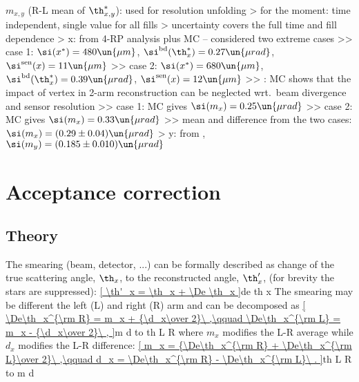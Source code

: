 \> $m_{x, y}$ (R-L mean of $\th_{x, y}^*$): used for resolution unfolding
\>> for the moment: time independent, single value for all fills
\>> uncertainty covers the full time and fill dependence
\>> x: from 4-RP analysis plus MC -- considered two extreme cases
\>>> case 1: $\si(x^*) = 480\un{\mu m}$, $\si^{\rm bd}(\th^*_x) = 0.27\un{\mu rad}$, $\si^{\rm sen}(x) = 11\un{\mu m}$
\>>> case 2: $\si(x^*) = 680\un{\mu m}$, $\si^{\rm bd}(\th^*_x) = 0.39\un{\mu rad}$, $\si^{\rm sen}(x) = 12\un{\mu m}$
\>>> : MC shows that the impact of vertex in 2-arm reconstruction can be neglected wrt.~beam divergence and sensor resolution
\>>> case 1: MC gives $\si(m_x) = 0.25\un{\mu rad}$
\>>> case 2: MC gives $\si(m_x) = 0.33\un{\mu rad}$
\>>> mean and difference from the two cases: $\si(m_x) = (0.29 \pm 0.04)\un{\mu rad}$
\>> y: from , $\si(m_y) = (0.185 \pm 0.010)\un{\mu rad}$


\section{Acceptance correction}

\subsection{Theory}

\vskip3mm

The smearing (beam, detector, ...) can be formally described as change of the true scattering angle, $\th_x$, to the reconstructed angle, $\th'_x$, (for brevity the stars are suppressed):
\eqref{
\th'_x = \th_x + \De \th_x
}{de th x}
The smearing may be different the left (L) and right (R) arm and can be decomposed as
\eqref{
\De\th_x^{\rm R} = m_x + {\d_x\over 2}\ ,\qquad \De\th_x^{\rm L} = m_x - {\d_x\over 2}\ ,
}{m d to th L R}
where $m_x$ modifies the L-R average while $d_x$ modifies the L-R difference:
\eqref{
m_x = {\De\th_x^{\rm R} + \De\th_x^{\rm L}\over 2}\ ,\qquad d_x = \De\th_x^{\rm R} - \De\th_x^{\rm L}\ .
}{th L R to m d}

